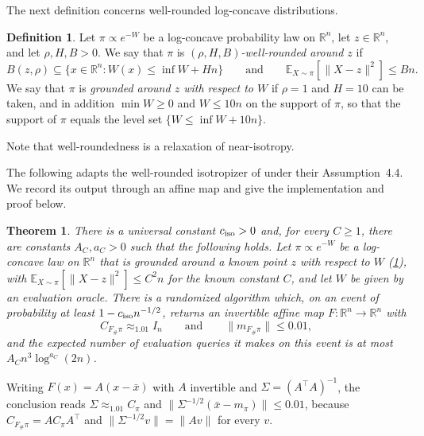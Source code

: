 \documentclass[11pt]{article}
\numberwithin{equation}{section}
\newtheorem{theorem}{Theorem}
\theoremstyle{definition}
\newtheorem{definition}[definition]{Definition}
\newcommand{\R}{\mathbb{R}}
\newcommand{\E}[2]{\mathbb{E}_{#1}\left[#2\right]}
\begin{document}
The next definition concerns well-rounded log-concave distributions.

\begin{definition}
\label{def:rounded}
Let $\pi\propto e^{-W}$ be a log-concave probability law on
$\R^n$, let
$z\in\R^n$, and let
$\rho,H,B>0$.
We say that $\pi$ is \emph{$(\rho,H,B)$-well-rounded around
$z$} if
\[
 B(z,\rho)\subseteq\{x\in\R^n: W(x)\leq\inf W+Hn\}
 \qquad\text{and}\qquad
 \E{X\sim\pi}{\|X-z\|^2}\leq Bn .
\]
We say that $\pi$ is \emph{grounded around
$z$ with respect to
$W$} if
$\rho=1$ and
$H=10$ can be taken, and in addition
$\min W\geq0$ and
$W\leq10n$ on the support of
$\pi$, so that the support of
$\pi$ equals the level set
$\{W\leq\inf W+10n\}$.
\end{definition}
Note that well-roundedness is a relaxation of near-isotropy.

The following adapts the well-rounded isotropizer of
\cite[Algorithm~4 and Lemma~4.11]{KV25} under their Assumption~4.4.
We record its output through an affine map and give the implementation
and proof below.

\begin{theorem}
\label{prelim:thm:wellr_iso}
There is a universal constant $c_{\rm iso}>0$ and, for every
$C\geq1$, there are constants
$A_C,a_C>0$ such that the following holds.
Let $\pi\propto e^{-W}$ be a log-concave law on
$\R^n$ that is grounded around a known point
$z$ with respect to
$W$ (\cref{def:rounded}), with
$\E{X\sim\pi}{\|X-z\|^2}\leq C^2n$ for the known constant
$C$, and let
$W$ be given by an evaluation oracle.
There is a randomized algorithm which, on an event of probability at least
$1-c_{\rm iso}n^{-1/2}$, returns an invertible affine map
$F:\R^n\to\R^n$ with
\[
 C_{F_\#\pi}\approx_{1.01}I_n
 \qquad\text{and}\qquad
 \|m_{F_\#\pi}\|\leq0.01,
\]
and the expected number of evaluation queries it makes on this event is at
most
$A_Cn^3\log^{a_C}(2n)$.
\end{theorem}
Writing $F(x)=A(x-\bar x)$ with
$A$ invertible and
$\Sigma=(A^\top A)^{-1}$, the conclusion reads
$\Sigma\approx_{1.01}C_\pi$ and
$\|\Sigma^{-1/2}(\bar x-m_\pi)\|\leq0.01$, because
$C_{F_\#\pi}=AC_\pi A^\top$ and
$\|\Sigma^{-1/2}v\|=\|Av\|$ for every
$v$.
\end{document}
